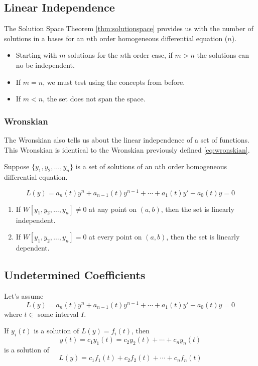 \documentclass[12pt, landscape, twocolumn]{article}
\begin{document}
    \subsection{Linear Independence}
    The Solution Space Theorem \eqref{thm:solutionspace} provides us with the number of solutions in a bases for an $n$th order homogeneous differential equation ($n$).

    \begin{itemize}
        \item Starting with $m$ solutions for the $n$th order case, if $m > n$ the solutions can no be independent.
        \item If $m=n$, we must test using the concepts from before.
        \item If $m < n$, the set does not span the space.
    \end{itemize}

        \subsubsection{Wronskian}
        The Wronskian also tells us about the linear independence of a set of functions. This Wronskian is identical to the Wronskian previously defined \eqref{eq:wronskian}.

        Suppose $\{y_1, y_2, \dots, y_n \}$ is a set of solutions of an $n$th order homogeneous differential equation.

            \[
                L(y) = a_n(t)y^n + a_{n-1}(t)y^{n-1} + \cdots + a_1 (t)y\prime + a_0 (t)y = 0
            \]
            \begin{enumerate}
                \item If $W[y_1, y_2, \dots, y_n] \neq 0$ at any point on $(a, b)$, then the set is linearly independent.
                \item If $W[y_1, y_2, \dots, y_n] = 0$ at every point on $(a, b)$, then the set is linearly dependent.
            \end{enumerate}

    \subsection{Undetermined Coefficients}\label{sec:2decoefficients}
    Let's assume
        \[ L(y) = a_n(t)y^n + a_{n-1}(t)y^{n-1} + \cdots + a_1 (t)y\prime + a_0 (t)y = 0 \]
    where $t \in $ some interval $I$.

    If $y_i(t)$ is a solution of $L(y) = f_i(t)$, then
        \[ y(t) = c_1 y_1(t) = c_2 y_2(t) + \cdots + c_n y_n(t) \]
    is a solution of
        \[ L(y) = c_1 f_1(t) + c_2 f_2(t) + \cdots + c_n f_n(t) \]
\end{document}
